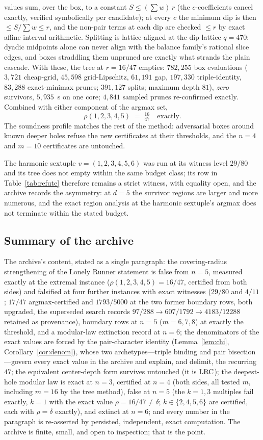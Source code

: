 values sum, over the box, to a constant $S\le(\sum w)\,r$ (the
$c$-coefficients cancel exactly, verified symbolically per candidate);
at every $c$ the minimum dip is then $\le S/\sum w\le r$, and the
non-pair terms at each dip are checked $\le r$ by exact affine interval
arithmetic. Splitting is lattice-aligned at the dip lattice $q=470$:
dyadic midpoints alone can never align with the balance family's
rational slice edges, and boxes straddling them unpruned are exactly
what strands the plain cascade. With these, the tree at $r=16/47$
empties: $782{,}255$ box evaluations ($3{,}721$ cheap-grid,
$45{,}598$ grid-Lipschitz, $61{,}191$ gap, $197{,}330$ triple-identity,
$83{,}288$ exact-minimax prunes; $391{,}127$ splits; maximum depth
$81$), \emph{zero} survivors, $5{,}935$~s on one core; $4{,}841$
sampled prunes re-confirmed exactly. Combined with either component of
the argmax set,
\[
\rho(1,2,3,4,5)\;=\;\tfrac{16}{47}\quad\text{exactly.}
\]
The soundness profile matches the rest of the method: adversarial boxes
around known deeper holes refuse the new certificates at their
thresholds, and the $n=4$ and $m=10$ certificates are untouched.

The harmonic sextuple $v=(1,2,3,4,5,6)$ was run at its witness level
$29/80$ and its tree does not empty within the same budget class; its
row in Table~\ref{tab:refute} therefore remains a strict witness, with
equality open, and the archive records the asymmetry: at
$d=5$ the survivor regions are larger and more numerous, and the exact
region analysis at the harmonic sextuple's argmax does not terminate
within the stated budget.

\subsection{Summary of the archive}

The archive's content, stated as a single paragraph: the
covering-radius strengthening of the Lonely Runner statement is false
from $n=5$, measured exactly at the extremal instance
($\rho(1,2,3,4,5)=16/47$, certified from both sides) and falsified at
four further instances with exact witnesses ($29/80$ and $4/11$;
$17/47$ argmax-certified and $1793/5000$ at the two former boundary
rows, both upgraded, the superseded search records
$97/288\to607/1792\to4183/12288$ retained as provenance), boundary
rows at $n=5$ ($m=6,7,8$) at exactly the threshold, and a modular-law
extinction record at $n=6$; the denominators of the exact values are
forced by the pair-character identity (Lemma~\ref{lem:chi},
Corollary~\ref{cor:denom}), whose two archetypes---triple binding and
pair bisection---govern every exact value in the archive and explain,
and delimit, the recurring $47$; the equivalent
center-depth form survives untouched (it is $\mathrm{LRC}$); the deepest-hole
modular law is exact at $n=3$, certified at $n=4$ (both sides, all
tested $m$, including $m=16$ by the tree method), false at $n=5$ (the
$k=1,3$ multiples fail exactly, $k=1$ with the exact value
$\rho=16/47\ne\delta$; $k\in\{2,4,5,6\}$ are certified, each with
$\rho=\delta$ exactly), and extinct at $n=6$; and every number in the
paragraph is re-asserted by persisted, independent, exact computation.
The archive is finite, small, and open to inspection; that is the
point.
